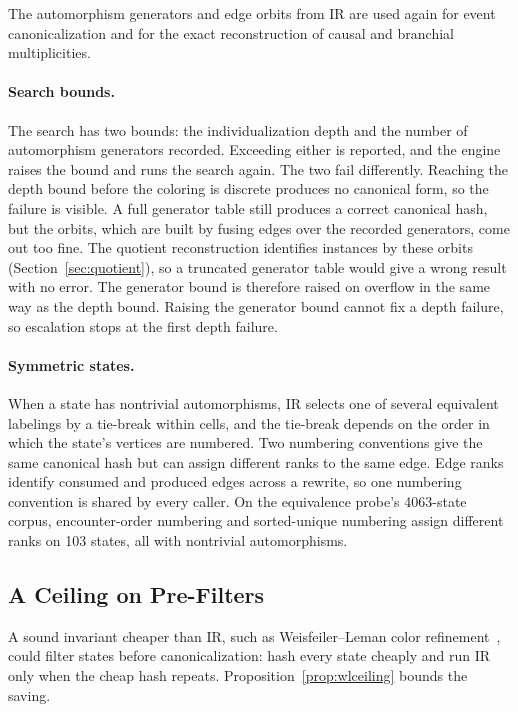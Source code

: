 The automorphism generators and edge orbits from IR are used again for event canonicalization and for the exact reconstruction of causal and branchial multiplicities.

\paragraph{Search bounds.} The search has two bounds: the individualization depth and the number of automorphism generators recorded. Exceeding either is reported, and the engine raises the bound and runs the search again. The two fail differently. Reaching the depth bound before the coloring is discrete produces no canonical form, so the failure is visible. A full generator table still produces a correct canonical hash, but the orbits, which are built by fusing edges over the recorded generators, come out too fine. The quotient reconstruction identifies instances by these orbits (Section~\ref{sec:quotient}), so a truncated generator table would give a wrong result with no error. The generator bound is therefore raised on overflow in the same way as the depth bound. Raising the generator bound cannot fix a depth failure, so escalation stops at the first depth failure.

\paragraph{Symmetric states.} When a state has nontrivial automorphisms, IR selects one of several equivalent labelings by a tie-break within cells, and the tie-break depends on the order in which the state's vertices are numbered. Two numbering conventions give the same canonical hash but can assign different ranks to the same edge. Edge ranks identify consumed and produced edges across a rewrite, so one numbering convention is shared by every caller. On the equivalence probe's 4063-state corpus, encounter-order numbering and sorted-unique numbering assign different ranks on 103 states, all with nontrivial automorphisms.

\subsection{A Ceiling on Pre-Filters}
\label{sec:wl}

A sound invariant cheaper than IR, such as Weisfeiler--Leman color refinement~\cite{weisfeiler1968reduction,shervashidze2011weisfeiler}, could filter states before canonicalization: hash every state cheaply and run IR only when the cheap hash repeats. Proposition~\ref{prop:wlceiling} bounds the saving.

